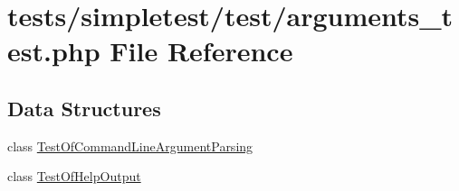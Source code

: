 \hypertarget{arguments__test_8php}{\section{tests/simpletest/test/arguments\-\_\-test.php File Reference}
\label{arguments__test_8php}
}
\subsection*{Data Structures}
\begin{DoxyCompactItemize}
\item 
class \hyperlink{class_test_of_command_line_argument_parsing}{Test\-Of\-Command\-Line\-Argument\-Parsing}
\item 
class \hyperlink{class_test_of_help_output}{Test\-Of\-Help\-Output}
\end{DoxyCompactItemize}

